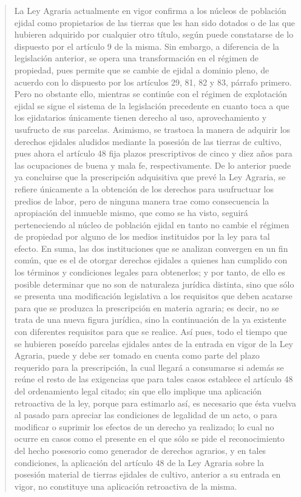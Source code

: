 \documentclass[11pt,a4paper]{article}
\begin{document}
\begin{quote}
La Ley Agraria actualmente en vigor confirma a los núcleos de población ejidal como propietarios de
las tierras que les han sido dotados o de las que hubieren adquirido por cualquier otro título, según
puede constatarse de lo dispuesto por el artículo 9 de la misma. Sin embargo, a diferencia de la
legislación anterior, se opera una transformación en el régimen de propiedad, pues permite que se
cambie de ejidal a dominio pleno, de acuerdo con lo dispuesto por los artículos 29, 81, 82 y 83,
párrafo primero. Pero no obstante ello, mientras se continúe con el régimen de explotación ejidal se
sigue el sistema de la legislación precedente en cuanto toca a que los ejidatarios únicamente tienen
derecho al uso, aprovechamiento y usufructo de sus parcelas. Asimismo, se trastoca la manera de
adquirir los derechos ejidales aludidos mediante la posesión de las tierras de cultivo, pues ahora el
artículo 48 fija plazos prescriptivos de cinco y diez años para las ocupaciones de buena y mala fe,
respectivamente. De lo anterior puede ya concluirse que la prescripción adquisitiva que prevé la Ley
Agraria, se refiere únicamente a la obtención de los derechos para usufructuar los predios de labor,
pero de ninguna manera trae como consecuencia la apropiación del inmueble mismo, que como se
ha visto, seguirá perteneciendo al núcleo de población ejidal en tanto no cambie el régimen de
propiedad por alguno de los medios instituidos por la ley para tal efecto. En suma, las dos
instituciones que se analizan convergen en un fin común, que es el de otorgar derechos ejidales a
quienes han cumplido con los términos y condiciones legales para obtenerlos; y por tanto, de ello es
posible determinar que no son de naturaleza jurídica distinta, sino que sólo se presenta una
modificación legislativa a los requisitos que deben acatarse para que se produzca la prescripción en
materia agraria; es decir, no se trata de una nueva figura jurídica, sino la continuación de la ya
existente con diferentes requisitos para que se realice. Así pues, todo el tiempo que se hubieren
poseído parcelas ejidales antes de la entrada en vigor de la Ley Agraria, puede y debe ser tomado
en cuenta como parte del plazo requerido para la prescripción, la cual llegará a consumarse si
además se reúne el resto de las exigencias que para tales casos establece el artículo 48 del
ordenamiento legal citado; sin que ello implique una aplicación retroactiva de la ley, porque para
estimarlo así, es necesario que ésta vuelva al pasado para apreciar las condiciones de legalidad de
un acto, o para modificar o suprimir los efectos de un derecho ya realizado; lo cual no ocurre en
casos como el presente en el que sólo se pide el reconocimiento del hecho posesorio como
generador de derechos agrarios, y en tales condiciones, la aplicación del artículo 48 de la Ley
Agraria sobre la posesión material de tierras ejidales de cultivo, anterior a su entrada en vigor, no
constituye una aplicación retroactiva de la misma.




\end{quote}
\end{document}

